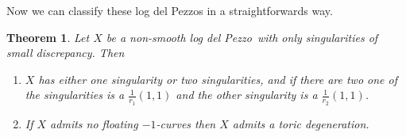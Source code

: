 \documentclass[12pt,a4paper]{book}      %
\newtheorem{thm}{Theorem}[section]
\newcommand{\ldp}{log del Pezzo}
\begin{document}
Now we can classify these log del Pezzos in a straightforwards way. 
\begin{thm}\label{ThmOnSing}
Let $X$ be a non-smooth \ldp\ with only singularities of small discrepancy. Then 
\begin{enumerate}
\item\label{thm38i}
$X$ has either one singularity or two singularities, and if there are two one of the singularities is a $\frac{1}{r_1}(1,1)$ and the other singularity is a $\frac{1}{r_2}(1,1)$.
\item\label{thm38ii}
If $X$ admits no floating $-1$-curves then $X$ admits a toric degeneration. %
\end{enumerate}
\end{thm}
\end{document}
